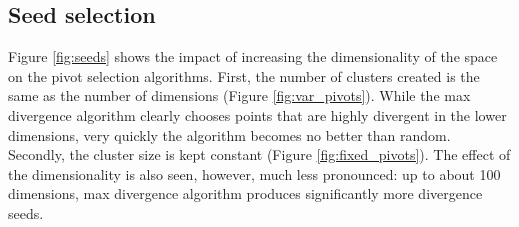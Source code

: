 \subsection{Seed selection}
Figure \ref{fig:seeds} shows the impact of increasing the dimensionality of the space on the pivot selection algorithms.  First, the number of clusters created is the same as the number of dimensions (Figure \ref{fig:var_pivots}).  While the max divergence algorithm clearly chooses points that are highly divergent in the lower dimensions, very quickly the algorithm becomes no better than random.  Secondly, the cluster size is kept constant (Figure \ref{fig:fixed_pivots}). The effect of the dimensionality is also seen, however, much less pronounced: up to about 100 dimensions, max divergence algorithm produces significantly more divergence seeds.  

